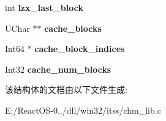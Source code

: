 \begin{DoxyCompactItemize}
int {\bfseries lzx\+\_\+last\+\_\+block}
\item 
\mbox{\label{structchm_file_a85ea4f286dea88d63b7de7141fe664ac}} 
U\+Char $\ast$$\ast$ {\bfseries cache\+\_\+blocks}
\item 
\mbox{\label{structchm_file_a0fde7f542c93892cb7ee936166f377bd}} 
Int64 $\ast$ {\bfseries cache\+\_\+block\+\_\+indices}
\item 
\mbox{\label{structchm_file_a3f06407f70bc307c1ae2068c0becee55}} 
Int32 {\bfseries cache\+\_\+num\+\_\+blocks}
\end{DoxyCompactItemize}


该结构体的文档由以下文件生成\+:\begin{DoxyCompactItemize}
\item 
E\+:/\+React\+O\+S-\/0../dll/win32/itss/chm\+\_\+lib.\+c\end{DoxyCompactItemize}
